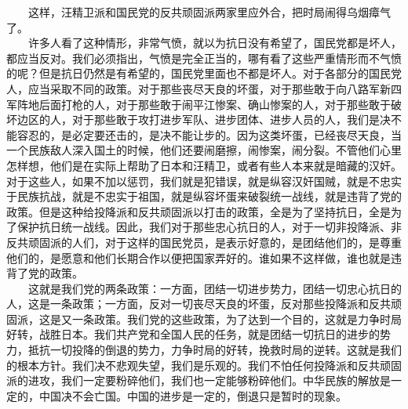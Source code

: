 \documentclass[cn,11pt,chinese]{elegantbook}
\begin{document}
　　这样，汪精卫派和国民党的反共顽固派两家里应外合，把时局闹得乌烟瘴气了。\\
　　许多人看了这种情形，非常气愤，就以为抗日没有希望了，国民党都是坏人，都应当反对。我们必须指出，气愤是完全正当的，哪有看了这些严重情形而不气愤的呢？但是抗日仍然是有希望的，国民党里面也不都是坏人。对于各部分的国民党人，应当采取不同的政策。对于那些丧尽天良的坏蛋，对于那些敢于向八路军新四军阵地后面打枪的人，对于那些敢于闹平江惨案、确山惨案的人，对于那些敢于破坏边区的人，对于那些敢于攻打进步军队、进步团体、进步人员的人，我们是决不能容忍的，是必定要还击的，是决不能让步的。因为这类坏蛋，已经丧尽天良，当一个民族敌人深入国土的时候，他们还要闹磨擦，闹惨案，闹分裂。不管他们心里怎样想，他们是在实际上帮助了日本和汪精卫，或者有些人本来就是暗藏的汉奸。对于这些人，如果不加以惩罚，我们就是犯错误，就是纵容汉奸国贼，就是不忠实于民族抗战，就是不忠实于祖国，就是纵容坏蛋来破裂统一战线，就是违背了党的政策。但是这种给投降派和反共顽固派以打击的政策，全是为了坚持抗日，全是为了保护抗日统一战线。因此，我们对于那些忠心抗日的人，对于一切非投降派、非反共顽固派的人们，对于这样的国民党员，是表示好意的，是团结他们的，是尊重他们的，是愿意和他们长期合作以便把国家弄好的。谁如果不这样做，谁也就是违背了党的政策。\\
　　这就是我们党的两条政策：一方面，团结一切进步势力，团结一切忠心抗日的人，这是一条政策；一方面，反对一切丧尽天良的坏蛋，反对那些投降派和反共顽固派，这是又一条政策。我们党的这些政策，为了达到一个目的，这就是力争时局好转，战胜日本。我们共产党和全国人民的任务，就是团结一切抗日的进步的势力，抵抗一切投降的倒退的势力，力争时局的好转，挽救时局的逆转。这就是我们的根本方针。我们决不悲观失望，我们是乐观的。我们不怕任何投降派和反共顽固派的进攻，我们一定要粉碎他们，我们也一定能够粉碎他们。中华民族的解放是一定的，中国决不会亡国。中国的进步是一定的，倒退只是暂时的现象。\\
\end{document}
